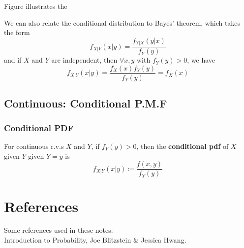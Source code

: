 \documentclass{article}
\begin{document}
\noindent Figure illustrates the 


\noindent We can also relate the conditional distribution to Bayes' theorem, which takes the form \begin{equation*}
    f_{X | Y} (x|y) = \frac{f_{Y | X}(y|x)}{f_Y (y)}
\end{equation*} and if $X$ and $Y$ are independent, then $\forall x, y$ with $f_Y (y) > 0$, we have \begin{equation*}
    f_{X|Y}(x|y) = \frac{f_X(x)f_Y(y)}{f_Y(y)} = f_X (x)
\end{equation*}


\subsection{Continuous: Conditional P.M.F}

\subsubsection{Conditional PDF}

\begin{definition}
    
    For continuous r.v.s $X$ and $Y$, if $f_Y (y) > 0$, then the \textbf{conditional pdf} of $X$ given $Y$ given $Y = y$ is \begin{equation}
        f_{X | Y}(x|y) \coloneq \frac{f(x,y)}{f_Y(y)}
    \end{equation} 
\end{definition}




\section*{References}

Some references used in these notes: \\ 

Introduction to Probability, Joe Blitzstein \& Jessica Hwang. 
\end{document}

